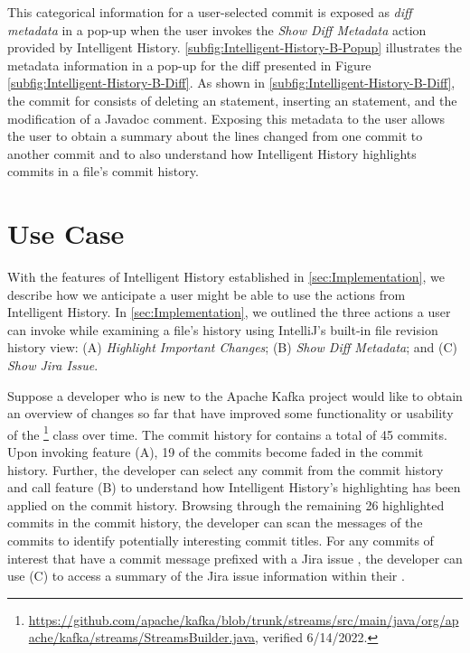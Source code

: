 This categorical information for a user-selected commit is exposed as \emph{diff metadata} in a pop-up when the user invokes the \textit{Show Diff Metadata} action provided by Intelligent History.
\autoref{subfig:Intelligent-History-B-Popup} illustrates the metadata information in a pop-up for the diff presented in Figure \autoref{subfig:Intelligent-History-B-Diff}.
As shown in \autoref{subfig:Intelligent-History-B-Diff}, the commit  for  consists of deleting an  statement, inserting an  statement, and the modification of a Javadoc comment.
Exposing this metadata to the user allows the user to obtain a summary about the lines changed from one commit to another commit and to also understand how Intelligent History highlights commits in a file's commit history.

\section{Use Case}
\label{sec:Use-Case}

With the features of Intelligent History established in \autoref{sec:Implementation}, we describe how we anticipate a user might be able to use the actions from Intelligent History. 
In \autoref{sec:Implementation}, we outlined the three actions a user can invoke while examining a file's history using IntelliJ's built-in file revision history view: (A) \textit{Highlight Important Changes}; (B) \textit{Show Diff Metadata}; and (C) \textit{Show Jira Issue}.

Suppose a developer who is new to the Apache Kafka project would like to obtain an overview of changes so far that have improved some functionality or usability of the \footnote{\url{https://github.com/apache/kafka/blob/trunk/streams/src/main/java/org/apache/kafka/streams/StreamsBuilder.java}, verified 6/14/2022.} class over time.
The commit history for  contains a total of 45 commits.
Upon invoking feature (A), 19 of the commits become faded in the commit history.
Further, the developer can select any commit from the commit history and call feature (B) to understand how Intelligent History's highlighting has been applied on the  commit history.
Browsing through the remaining 26 highlighted commits in the  commit history, the developer can scan the messages of the commits to identify potentially interesting commit titles.
For any commits of interest that have a commit message prefixed with a Jira issue , the developer can use (C) to access a summary of the Jira issue information within their .

